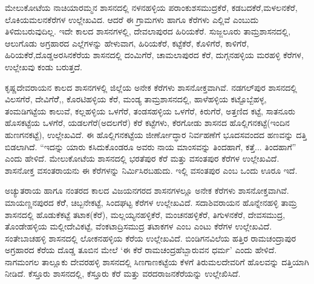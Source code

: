 ಮೇಲುಕೋಟೆಯ ನಾಚಿಯಾರಮ್ಮನ ಶಾಸನದಲ್ಲಿ ನಳನಹಳ್ಳಿಯ ಪರಾಂಕುಶಸಮುದ್ರಕೆರೆ, ಕಡಬದಕೆರೆ,\break ಮಳಲನಕೆರೆ, ಲೊಕಿಯಮಲನಕೆರೆಗಳ ಉಲ್ಲೇಖವಿದ. ಆದರೆ ಈ ಗ್ರಾಮಗಳು ಹಾಗೂ ಕೆರೆಗಳು ಎಲ್ಲಿವೆ ಎಂಬುದು ತಿಳಿದುಬರುವುದಿಲ್ಲ. ಇದೇ ಕಾಲದ ಶಾಸನಗಳಲ್ಲಿ, ದೇವಲಾಪುರದ ಹಿರಿಯಕೆರೆ. ಸುಜ್ಜಲೂರು ತಾಮ್ರಶಾಸನದಲ್ಲಿ, ಆಲುಗೊಡು ಅಗ್ರಹಾರದ ಎಲ್ಲೆಗಳನ್ನು ಹೇಳುವಾಗ, ಹಿರಿಯಕೆರೆ, ಕಟ್ಟೆಕೆರೆ, ಕೊಳಿಗೆರೆ, ಕಾಳಿಗೆರೆ, ಹಿರಿಯಕೆರೆ,\break ದೊಡ್ಡಅರಸಿನಕೆರೆಯ ಶಾಸನದಲ್ಲಿ ದಂಮಿಗೆರೆ, ಚಾಮಲಾಪುರದ ಕೆರೆ, ದುಗ್ಗನಹಳ್ಳಿಯ ಮರಹಳ್ಳಿ ಕೆರೆಗಳ, ಉಲ್ಲೇಖವು ಕಂಡು ಬರುತ್ತದೆ.

ಕೃಷ್ಣದೇವರಾಯನ ಕಾಲದ ಶಾಸನಗಳಲ್ಲಿ ಜಿಲ್ಲೆಯ ಅನೇಕ ಕೆರೆಗಳು ಶಾಸನೋಕ್ತವಾಗಿವೆ. ನಡಗಲ್​ಪುರ ಶಾಸನದಲ್ಲಿ ವಿಲಸಗೆರೆ, ದೇವಿಗೆರೆೆ,, ಕೊರಟಿಹಳ್ಳಿಯ ಕೆರೆ, ಮಂಡ್ಯ ತಾಮ್ರಶಾಸನದಲ್ಲಿ, ಹಾಳೆಹಳ್ಳಿಯ ಕಟ್ಟೊಬ್ಬೆಹಳ್ಳ, ತಂಮಡಿಗಟ್ಟೆಯ ಕಾಲುವೆ, ಕಲ್ಲಹಳ್ಳಿಯ ಒಳಗೆರೆ, ತಂಡಸಹಳ್ಳಿಯ ಒಳಗೆರೆ, ಕಿರುಗೆರೆ, ಅತ್ತಣಿದ ಕಟ್ಟೆ, ಸಾತನೂರು ಹೊಸಕಟ್ಟೆಯ ಒಳಗೆರೆ, ಯಡಲಗೆರೆ(ಅದಲಗೆರೆ) ಕೆರೆ ಕಟ್ಟೆಗಳು, ಕೆರಗೋಡು ಶಾಸನದ ಹೊಲ್ಲಿಗನಕಟ್ಟೆ(ಇಂದಿನ ಹುಣಗನಕಟ್ಟೆ), ಉಲ್ಲೇಖವಿದೆ. ಈ ಹೊಲ್ಲಿಗನಕಟ್ಟೆಯ ಜೀರ್ಣೋದ್ಧಾರ ನಿರ್ವಹಣೆಗೆ ಭೂದಸವಂದದ ಹಣವನ್ನು ದತ್ತಿ ಬಿಡಲಾಗಿದೆ. “ಇದನ್ನು ಯಾರು ಕಸಿದುಕೊಂಡರೂ ಅವರು ನಾಯ ಮಾಂಸವನ್ನು ತಿಂದಹಾಗೆ, ಕತ್ತೆ... ತಿಂದಹಾಗೆ” ಎಂದು ಹೇಳಿದೆ. ಮೇಲುಕೋಟೆಯ ಶಾಸನದಲ್ಲಿ ಭರತೆಪುರ ಕೆರೆ ಮತ್ತು ವಸಂತಪುರ ಕೆರೆಗಳ ಉಲ್ಲೇಖವಿದೆ. ಶಾಸನೋಕ್ತ ವಸಂತರಾಯನು ಈ ಕೆರೆಗಳನ್ನು ನಿರ್ಮಿಸಿರಬಹುದು. ಇಲ್ಲಿ ವಸಂತಪುರ ಎಂಬ ಒಂದು ಊರೂ ಇದೆ.

ಅಚ್ಯುತರಾಯ ಹಾಗೂ ನಂತರದ ಕಾಲದ ವಿಜಯನಗರದ ಶಾಸನಗಳಲ್ಲೂ ಅನೇಕ ಕೆರೆಗಳು ಶಾಸನೋಕ್ತವಾಗಿವೆ. ಮಾಯಣ್ಣನಪುರದ ಕೆರೆೆ, ಚಿಬ್ಬನೇಕಟ್ಟೆ, ಸಿಂದಘಟ್ಟ ಕೆರೆಗಳ ಉಲ್ಲೇಖವಿದೆ. ಸದಾಶಿವರಾಯನ ಹೊನ್ನೇನಹಳ್ಳಿ ತಾಮ್ರ ಶಾಸನದಲ್ಲಿ ಹೊಡುಕೆಕಟ್ಟೆ ತಟಾಕ(ಕೆರೆ), ಮಲ್ಲಯ್ಯನಹಳ್ಳಿಕೆರೆ, ಮಂಚನಹಳ್ಳಿಕೆರೆ, ತಿಗುಳನಕೆರೆ, ದೇವಸಮುದ್ರ, ತೊಂಡೇಹಳ್ಳಿಯ ಮಲ್ಲೀದೇವಿಕಟ್ಟೆ, ವೆಂಕಟಾದ್ರಿಸಮುದ್ರ ತಟಾಕಗಳ ಎಂಬ ಎಂಟು ಕೆರೆಗಳ ಉಲ್ಲೇಖವಿದೆ. ಸಂತೇಬಾಚಹಳ್ಳಿ ಶಾಸನದಲ್ಲಿ ಲೋಕನಹಳ್ಳಿಯ ಕೆರೆಯ ಉಲ್ಲೇಖವಿದೆ. ಬಿಂಡಿಗನವಿಲೆಯ ಹತ್ತಿರ ರಾಮಚಂದ್ರಾಪುರ ಅಗ್ರಹಾರದ ಕೆರೆಯ ದೊಡ್ಡ ತೂಬಿನ ಮೇಲೆ ‘ಈ ಕೆರೆ ರಾಮಚಂದ್ರಹೆಬ್ಬಾರುವನ ಧರ್ಮ’ ಎಂದು ಹೇಳಿದೆ. ನಾಗಮಂಗಲ ತಾಲ್ಲೂಕು ದೇವರಹಳ್ಳಿ ಶಾಸನದಲ್ಲಿ ಸಿಣಗಾಣಕಟ್ಟೆಯ ಕೆಳಗೆ ತಿರುಮಲದೇವರಿಗೆ ಹೊಲವನ್ನು ದತ್ತಿಯಾಗಿ ನೀಡಿದೆ. ಕೆಸ್ತೂರು ಶಾಸನದಲ್ಲಿ, ಕೆಸ್ತೂರು ಕೆರೆ ಮತ್ತು ವರದರಾಜನಕೆರೆಯನ್ನು ಉಲ್ಲೇಖಿಸಿದೆ.


